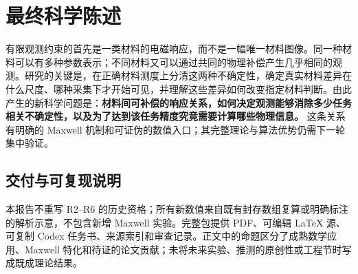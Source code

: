 \section{最终科学陈述}
\begin{tcolorbox}
有限观测约束的首先是一类材料的电磁响应，而不是一幅唯一材料图像。同一种材料可以有多种参数表示；不同材料又可以通过共同的物理补偿产生几乎相同的观测。研究的关键是，在正确材料测度上分清这两种不确定性，确定真实材料差异在什么尺度、哪种采集下才开始可见，并理解这些差异如何改变指定材料判断。由此产生的新科学问题是：\textbf{材料间可补偿的响应关系，如何决定观测能够消除多少任务相关不确定性，以及为了达到该任务精度究竟需要计算哪些物理信息。} 这条关系有明确的 Maxwell 机制和可证伪的数值入口；其完整理论与算法优势仍需下一轮集中验证。
\end{tcolorbox}

\subsection{交付与可复现说明}
本报告不重写 R2--R6 的历史资格；所有新数值来自既有封存数组复算或明确标注的解析示意，不包含新增 Maxwell 实验。完整包提供 PDF、可编辑 LaTeX 源、可复制 Codex 任务书、来源索引和审查记录。正文中的命题区分了成熟数学应用、Maxwell 特化和待证的论文贡献；未将未来实验、推测的原创性或工程节时写成既成理论结果。

